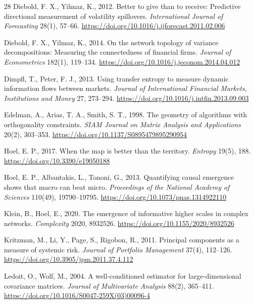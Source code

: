 \documentclass[12pt]{article}
\begin{document}
\begin{thebibliography}{28}
Diebold, F. X., Yilmaz, K., 2012.
\newblock Better to give than to receive: Predictive directional measurement of volatility spillovers.
\newblock \emph{International Journal of Forecasting} 28(1), 57--66. \url{https://doi.org/10.1016/j.ijforecast.2011.02.006}

Diebold, F. X., Yilmaz, K., 2014.
\newblock On the network topology of variance decompositions: Measuring the connectedness of financial firms.
\newblock \emph{Journal of Econometrics} 182(1), 119--134. \url{https://doi.org/10.1016/j.jeconom.2014.04.012}

Dimpfl, T., Peter, F. J., 2013.
\newblock Using transfer entropy to measure dynamic information flows between markets.
\newblock \emph{Journal of International Financial Markets, Institutions and Money} 27, 273--294. \url{https://doi.org/10.1016/j.intfin.2013.09.003}

Edelman, A., Arias, T. A., Smith, S. T., 1998.
\newblock The geometry of algorithms with orthogonality constraints.
\newblock \emph{SIAM Journal on Matrix Analysis and Applications} 20(2), 303--353. \url{https://doi.org/10.1137/S0895479895290954}

Hoel, E. P., 2017.
\newblock When the map is better than the territory.
\newblock \emph{Entropy} 19(5), 188. \url{https://doi.org/10.3390/e19050188}

Hoel, E. P., Albantakis, L., Tononi, G., 2013.
\newblock Quantifying causal emergence shows that macro can beat micro.
\newblock \emph{Proceedings of the National Academy of Sciences} 110(49), 19790--19795. \url{https://doi.org/10.1073/pnas.1314922110}

Klein, B., Hoel, E., 2020.
\newblock The emergence of informative higher scales in complex networks.
\newblock \emph{Complexity} 2020, 8932526. \url{https://doi.org/10.1155/2020/8932526}

Kritzman, M., Li, Y., Page, S., Rigobon, R., 2011.
\newblock Principal components as a measure of systemic risk.
\newblock \emph{Journal of Portfolio Management} 37(4), 112--126. \url{https://doi.org/10.3905/jpm.2011.37.4.112}

Ledoit, O., Wolf, M., 2004.
\newblock A well-conditioned estimator for large-dimensional covariance matrices.
\newblock \emph{Journal of Multivariate Analysis} 88(2), 365--411. \url{https://doi.org/10.1016/S0047-259X(03)00096-4}


\end{thebibliography}
\end{document}
